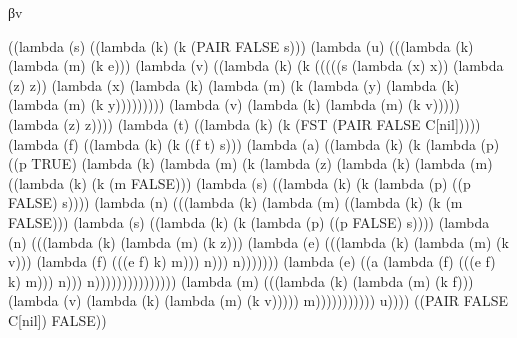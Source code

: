 \documentclass[ms,electronic,twosidetoc,letterpaper,chaptercenter,parttop]{byumsphd}
\begin{document}
\begin{theorem}
βv
\begin{schemedisplay}
((lambda (s) ((lambda (k) (k (PAIR FALSE s)))
        (lambda (u) (((lambda (k) (lambda (m) (k e)))
                (lambda (v) ((lambda (k) (k (((((s (lambda (x) x)) (lambda (z) z))
                                   (lambda (x) (lambda (k) (lambda (m) (k (lambda (y) (lambda (k) (lambda (m) (k y)))))))))
                                  (lambda (v) (lambda (k) (lambda (m) (k v))))) (lambda (z) z))))
                       (lambda (t) ((lambda (k) (k (FST
                                        (PAIR FALSE C[nil]))))
                              (lambda (f) ((lambda (k) (k ((f t) s)))
                                     (lambda (a) ((lambda (k) (k (lambda (p) ((p TRUE)
                                                            (lambda (k) (lambda (m) (k (lambda (z) (lambda (k) (lambda (m) ((lambda (k) (k (m FALSE)))
                                                                                              (lambda (s) ((lambda (k) (k (lambda (p) ((p FALSE) s))))
                                                                                                     (lambda (n) (((lambda (k) (lambda (m) ((lambda (k) (k (m FALSE)))
                                                                                                                          (lambda (s) ((lambda (k) (k (lambda (p) ((p FALSE) s))))
                                                                                                                                 (lambda (n) (((lambda (k) (lambda (m) (k z)))
                                                                                                                                         (lambda (e) (((lambda (k) (lambda (m) (k v)))
                                                                                                                                                 (lambda (f) (((e f) k) m))) n))) n)))))))
                                                                                                             (lambda (e) ((a (lambda (f) (((e f) k) m))) n))) n)))))))))))))))
                                            (lambda (m) (((lambda (k) (lambda (m) (k f)))
                                                    (lambda (v) (lambda (k) (lambda (m) (k v))))) m))))))))))) u))))
 ((PAIR FALSE C[nil])
  FALSE))
\end{schemedisplay}


\end{theorem}
\end{document}
